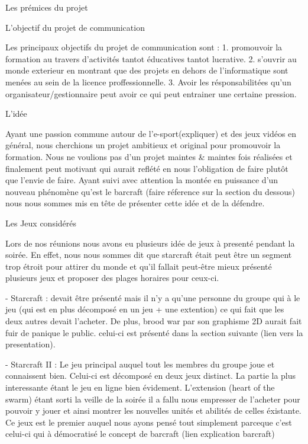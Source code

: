 Les prémices du projet

  L'objectif du projet de communication

    Les principaux objectifs du projet de communication sont :
      1. promouvoir la formation au travers d'activités tantot éducatives
      tantot lucrative.
      2. s'ouvrir au monde exterieur en montrant que des projets en dehors
      de l'informatique sont menées au sein de la licence
      proffessionnelle.
      3. Avoir les résponsabilitées qu'un organisateur/gestionnaire peut
      avoir ce qui peut entrainer une certaine pression.

  L'idée

    Ayant une passion commune autour de l'e-sport(expliquer) et des jeux
    vidéos en général, nous cherchions un projet ambitieux et original
    pour promouvoir la formation. Nous ne voulions pas d'un projet maintes
    & maintes fois réalisées et finalement peut motivant qui aurait
    reflété en nous l'obligation de faire plutôt que l'envie de faire.
    Ayant suivi avec attention la montée en puissance d'un nouveau
    phénomène qu'est le barcraft (faire réference sur la section du
    dessous) nous nous sommes mis en tête de présenter cette idée et de la
    défendre.

  Les Jeux considérés

    Lors de nos réunions nous avons eu plusieurs idée de jeux à presenté
    pendant la soirée. En effet, nous nous sommes dit que starcraft
    était peut être un segment trop étroit pour attirer du monde et
    qu'il fallait peut-être mieux présenté plusieurs jeux et proposer
    des plages horaires pour ceux-ci.

    - Starcraft : devait être présenté mais il n'y a qu'une personne du
    groupe qui à le jeu (qui est en plus décomposé en un jeu + une
    extention) ce qui fait que les deux autres devait l'acheter. De
    plus, brood war par son graphisme 2D aurait fait fuir de panique le
    public. celui-ci est présenté dans la section suivante (lien vers la
    presentation).

    - Starcraft II : Le jeu principal auquel tout les membres du groupe
    joue et connaissent bien. Celui-ci est décomposé en deux jeux distinct.
    La partie la plus interessante étant le jeu en ligne bien évidement.
    L'extension (heart of the swarm) étant sorti la veille de la soirée il a
    fallu nous empresser de l'acheter pour pouvoir y jouer et ainsi montrer
    les nouvelles unités et abilités de celles éxistante. Ce jeux est le
    premier auquel nous ayons pensé tout simplement parceque c'est celui-ci
    qui à démocratisé le concept de barcraft (lien explication barcraft)

